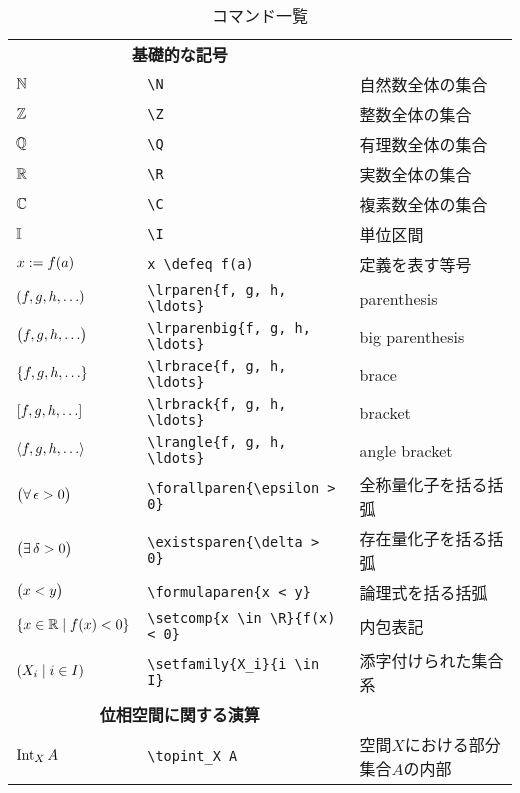 \documentclass[uplatex, dvipdfmx, a4paper, 12pt, class=jsarticle, crop=false]{standalone}
\begin{document}
\newcommand{\tablesubtitle}[1]{\multicolumn{2}{c}{\textbf{#1}}}

\begin{table}[htb]
	\centering
	\renewcommand{\arraystretch}{0.9}
	\caption{コマンド一覧}
	\begin{tabular}{ll@{\qquad}l}
		\hline
		\hline
		\tablesubtitle{基礎的な記号} \\
		$\mathbb{N}$ & \verb|\N| & 自然数全体の集合 \\
		$\mathbb{Z}$ & \verb|\Z| & 整数全体の集合   \\
		$\mathbb{Q}$ & \verb|\Q| & 有理数全体の集合 \\
		$\mathbb{R}$ & \verb|\R| & 実数全体の集合   \\
		$\mathbb{C}$ & \verb|\C| & 複素数全体の集合 \\
		$\mathbb{I}$ & \verb|\I| & 単位区間         \\
		$x \mathrel{:=} f(a)$ & \verb|x \defeq f(a)| & 定義を表す等号 \\
		$\lrparen{f, g, h, \ldots}$    & \verb|\lrparen{f, g, h, \ldots}|    & parenthesis          \\
		$\bigl({f, g, h, \ldots}\bigr)$ & \verb|\lrparenbig{f, g, h, \ldots}| & big parenthesis      \\
		$\lrbrace{f, g, h, \ldots}$    & \verb|\lrbrace{f, g, h, \ldots}|    & brace                \\
		$\lrbrack{f, g, h, \ldots}$    & \verb|\lrbrack{f, g, h, \ldots}|    & bracket              \\
		$\lrangle{f, g, h, \ldots}$    & \verb|\lrangle{f, g, h, \ldots}|    & angle bracket        \\
		$\bigl({\forall\, \epsilon > 0}\bigr)$   & \verb|\forallparen{\epsilon > 0}|   & 全称量化子を括る括弧 \\
		$\bigl({\exists\, \delta > 0}\bigr)$     & \verb|\existsparen{\delta > 0}|     & 存在量化子を括る括弧 \\
		$\bigl({x < y}\bigr)$         & \verb|\formulaparen{x < y}|         & 論理式を括る括弧     \\
		$\setcomp{x \in \R}{f(x) < 0}$ & \verb|\setcomp{x \in \R}{f(x) < 0}| & 内包表記             \\
		$\setfamily{X_i}{i \in I}$     & \verb|\setfamily{X_i}{i \in I}|     & 添字付けられた集合系 \\
		\hline
		\tablesubtitle{位相空間に関する演算} \\
		$\mathop{\mathrm{Int}}\nolimits_X A$ & \verb|\topint_X A| & 空間$X$における部分集合$A$の内部   \\

\end{tabular}
\end{table}
\end{document}
